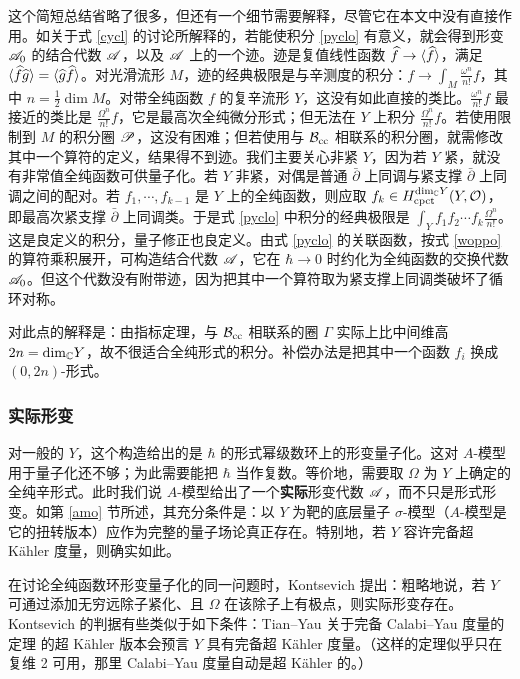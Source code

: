 这个简短总结省略了很多，但还有一个细节需要解释，尽管它在本文中没有直接作用。如关于式 \eqref{cycl} 的讨论所解释的，若能使积分 \eqref{pyclo} 有意义，就会得到形变 ${\mathscr A}_0$ 的结合代数 ${\mathscr A}$，以及 ${\mathscr A}$ 上的一个迹。迹是复值线性函数 $\widehat f\to\langle\widehat f\rangle$，满足 $\langle\widehat f\widehat g\rangle=\langle\widehat g\widehat f\rangle$。对光滑流形 $M$，迹的经典极限是与辛测度的积分：$f\to\int_M\frac{\omega^n}{n!}f$，其中 $n=\frac12\dim M$。对带全纯函数 $f$ 的复辛流形 $Y$，这没有如此直接的类比。$\frac{\omega^n}{n!}f$ 最接近的类比是 $\frac{\Omega^n}{n!}f$，它是最高次全纯微分形式；但无法在 $Y$ 上积分 $\frac{\Omega^n}{n!}f$。若使用限制到 $M$ 的积分圈 ${\mathscr P}$，这没有困难；但若使用与 ${\mathcal B}_{\mathrm{cc}}$ 相联系的积分圈，就需修改其中一个算符的定义，结果得不到迹。我们主要关心非紧 $Y$，因为若 $Y$ 紧，就没有非常值全纯函数可供量子化。若 $Y$ 非紧，对偶是普通 $\bar\partial$ 上同调与紧支撑 $\bar\partial$ 上同调之间的配对。若 $f_1,\cdots,f_{k-1}$ 是 $Y$ 上的全纯函数，则应取 $f_k\in H^{{\mathrm{dim}}_{\mathbb C} Y}_{\mathrm{cpct}}(Y,{\mathcal O})$，即最高次紧支撑 $\bar\partial$ 上同调类。于是式 \eqref{pyclo} 中积分的经典极限是 $\int_Yf_1f_2\cdots f_k\frac{\Omega^n}{n!}$。这是良定义的积分，量子修正也良定义。由式 \eqref{pyclo} 的关联函数，按式 \eqref{woppo} 的算符乘积展开，可构造结合代数 ${\mathscr A}$，它在 $\hbar\to0$ 时约化为全纯函数的交换代数 ${\mathscr A}_0$。但这个代数没有附带迹，因为把其中一个算符取为紧支撑上同调类破坏了循环对称。

\cite{W} 对此点的解释是：由指标定理，与 ${\mathcal B}_{\mathrm{cc}}$ 相联系的圈 $\Gamma$ 实际上比中间维高 $2n={\mathrm{dim}}_{\mathbb C} Y$，故不很适合全纯形式的积分。补偿办法是把其中一个函数 $f_i$ 换成 $(0,2n)$-形式。

\subsubsection{实际形变}\label{actual}

对一般的 $Y$，这个构造给出的是 $\hbar$ 的形式幂级数环上的形变量子化。这对 $A$-模型用于量子化还不够；为此需要能把 $\hbar$ 当作复数。等价地，需要取 $\Omega$ 为 $Y$ 上确定的全纯辛形式。此时我们说 $A$-模型给出了一个\textbf{实际}形变代数 ${\mathscr A}$，而不只是形式形变。如第 \ref{amo} 节所述，其充分条件是：以 $Y$ 为靶的底层量子 $\sigma$-模型（$A$-模型是它的扭转版本）应作为完整的量子场论真正存在。特别地，若 $Y$ 容许完备超 Kähler 度量，则确实如此。

在讨论全纯函数环形变量子化的同一问题时，Kontsevich \cite{K2} 提出：粗略地说，若 $Y$ 可通过添加无穷远除子紧化、且 $\Omega$ 在该除子上有极点，则实际形变存在。Kontsevich 的判据有些类似于如下条件：Tian--Yau 关于完备 Calabi--Yau 度量的定理 \cite{TY} 的超 Kähler 版本会预言 $Y$ 具有完备超 Kähler 度量。（这样的定理似乎只在复维 2 可用，那里 Calabi--Yau 度量自动是超 Kähler 的。）

